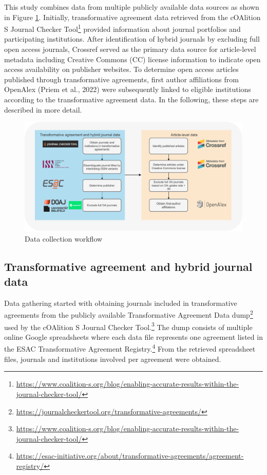 \documentclass[a4paper,man,floatsintext,longtable,noextraspace,12pt]{apa6}
\begin{document}
This study combines data from multiple publicly available data sources
as shown in Figure \ref{fig:data_workflow}. Initially, transformative
agreement data retrieved from the cOAlition S Journal Checker
Tool\footnote{\url{https://www.coalition-s.org/blog/enabling-accurate-results-within-the-journal-checker-tool/}}
provided information about journal portfolios and participating
institutions. After identification of hybrid journals by excluding full
open access journals, Crossref served as the primary data source for
article-level metadata including Creative Commons (CC) license
information to indicate open access availability on publisher websites.
To determine open access articles published through transformative
agreements, first author affiliations from OpenAlex (Priem et al., 2022)
were subsequently linked to eligible institutions according to the
transformative agreement data. In the following, these steps are
described in more detail.

\begin{figure}[ht!]

{\centering \includegraphics[width=0.99\linewidth,]{data_collection_workflow} 

}

\caption{Data collection workflow}\label{fig:data_workflow}
\end{figure}

\hypertarget{transformative-agreement-and-hybrid-journal-data}{%
\subsection{Transformative agreement and hybrid journal
data}\label{transformative-agreement-and-hybrid-journal-data}}

Data gathering started with obtaining journals included in
transformative agreements from the publicly available Transformative
Agreement Data dump\footnote{\url{https://journalcheckertool.org/transformative-agreements/}}
used by the cOAlition S Journal Checker Tool.\footnote{\url{https://www.coalition-s.org/blog/enabling-accurate-results-within-the-journal-checker-tool/}}
The dump consists of multiple online Google spreadsheets where each data
file represents one agreement listed in the ESAC Transformative
Agreement Registry.\footnote{\url{https://esac-initiative.org/about/transformative-agreements/agreement-registry/}}
From the retrieved spreadsheet files, journals and institutions involved
per agreement were obtained.
\end{document}
